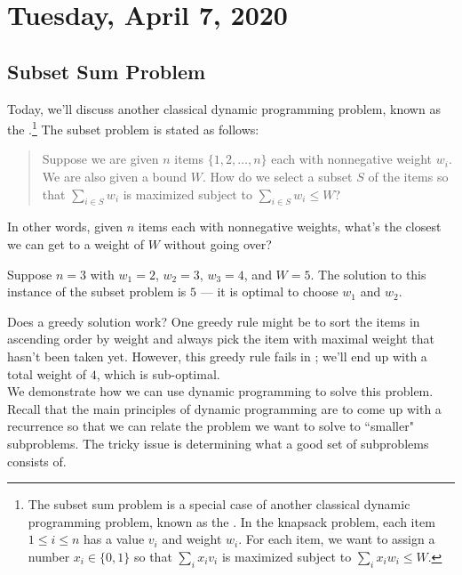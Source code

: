 \newpage
\section{Tuesday, April 7, 2020} 

\subsection{Subset Sum Problem}

Today, we'll discuss another classical dynamic programming problem, known as the .\footnote{The subset sum problem is a special case of another classical dynamic programming problem, known as the . In the knapsack problem, each item $1 \leq i \leq n$ has a value $v_i$ and weight $w_i$. For each item, we want to assign a number $x_i \in \{0, 1\}$ so that $\sum_{i}x_iv_i$ is maximized subject to $\sum_{i} x_i w_i \leq W$. } The subset problem is stated as follows:

\begin{quote}
    Suppose we are given $n$ items $\{1, 2, \ldots, n\}$ each with nonnegative weight $w_i$. We are also given a bound $W$. How do we select a subset $S$ of the items so that $\sum_{i\in S} w_i$ is maximized subject to $\sum_{i\in S} w_i \leq W$?
\end{quote}

In other words, given $n$ items each with nonnegative weights, what's the closest we can get to a weight of $W$ without going over?  \\

\begin{example}
 Suppose $n = 3$ with $w_1 = 2$, $w_2 = 3$, $w_3 = 4$, and $W = 5$. The solution to this instance of the subset problem is $\boxed{5}$ --- it is optimal to choose $w_1$ and $w_2$. 
\label{greedy:01}
\end{example}

Does a greedy solution work? One greedy rule might be to sort the items in ascending order by weight and always pick the item with maximal weight that hasn't been taken yet. However, this greedy rule fails in ; we'll end up with a total weight of $4$, which is sub-optimal. \\

We demonstrate how we can use dynamic programming to solve this problem. Recall that the main principles of dynamic programming are to come up with a recurrence so that we can relate the problem we want to solve to ``smaller" subproblems. The tricky issue is determining what a good set of subproblems consists of. \\

